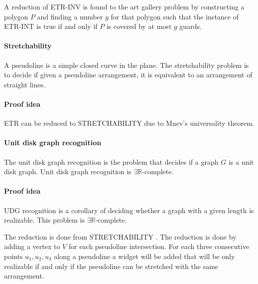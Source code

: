 A reduction of ETR-INV is found to the art gallery problem by constructing
a polygon $P$ and finding a number $g$ for that polygon such that the instance
of ETR-INT is true if and only if $P$ is covered by at most $g$ guards.

\paragraph{Stretchability} A pseudoline is a simple closed curve in the plane.
The stretchability problem is to decide if given a pseudoline arrangement,
it is equivalent to an arrangement of straight lines.

\paragraph{Proof idea} ETR can be reduced to STRETCHABILITY due to Mnev's
universality theorem. \cite{10.1007/978-3-642-11805-0_32}

\paragraph{Unit disk graph recognition} The unit disk graph recognition is
the problem that decides if a graph $G$ is a unit disk graph. Unit disk graph
recognition is $\exists \mathbb{R}$-complete. \cite{Schaefer2013}

\paragraph{Proof idea} UDG recognition is a corollary of deciding whether a graph
with a given length is realizable. This problem is $\exists \mathbb{R}$-complete.

The reduction is done from STRETCHABILITY \cite{Schaefer2013}. The reduction is
done by adding a vertex to $V$ for each pseudoline intersection. For each three
consecutive points $u_1, u_2, u_3$ along a pseudoline a widget will be added that will
be only realizable if and only if the pseudoline can be stretched with the same
arrangement.
